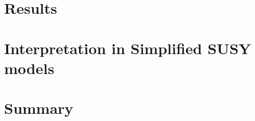 \section{Results}
\label{sec:results}


\section{Interpretation in Simplified SUSY models}
\label{sec:susy}


\section{Summary}
\label{sec:summary}



